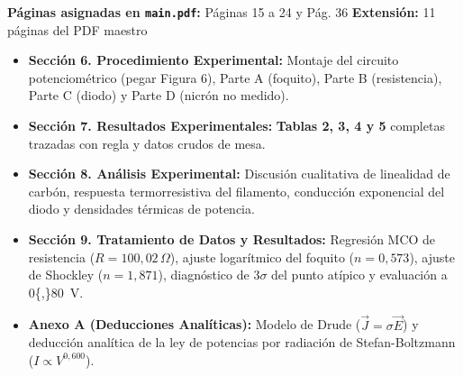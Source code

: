 \documentclass[a4paper, 10pt]{article}
\begin{document}
\begin{tcolorbox}[title=BLOQUE 2 — Asignado a: Gerald Giordano Casañe Ramírez, colframe=box-green]
    \footnotesize
    \textbf{Páginas asignadas en \texttt{main.pdf}:} Páginas 15 a 24 y Pág. 36 \hfill \textbf{Extensión:} 11 páginas del PDF maestro
    \begin{itemize}[leftmargin=1.5em, itemsep=1.2pt, topsep=1pt]
        \item \textbf{Sección 6. Procedimiento Experimental:} Montaje del circuito potenciométrico (pegar Figura 6), Parte A (foquito), Parte B (resistencia), Parte C (diodo) y Parte D (nicrón no medido).
        \item \textbf{Sección 7. Resultados Experimentales:} \textbf{Tablas 2, 3, 4 y 5} completas trazadas con regla y datos crudos de mesa.
        \item \textbf{Sección 8. Análisis Experimental:} Discusión cualitativa de linealidad de carbón, respuesta termorresistiva del filamento, conducción exponencial del diodo y densidades térmicas de potencia.
        \item \textbf{Sección 9. Tratamiento de Datos y Resultados:} Regresión MCO de resistencia ($R = 100{,}02\,\Omega$), ajuste logarítmico del foquito ($n = 0{,}573$), ajuste de Shockley ($n = 1{,}871$), diagnóstico de $3\sigma$ del punto atípico y evaluación a \qty{0{,}80}{\volt}.
        \item \textbf{Anexo A (Deducciones Analíticas):} Modelo de Drude ($\vec{J} = \sigma \vec{E}$) y deducción analítica de la ley de potencias por radiación de Stefan-Boltzmann ($I \propto V^{0{,}600}$).
    \end{itemize}
\end{tcolorbox}

\vspace{0.05cm}
\end{document}
